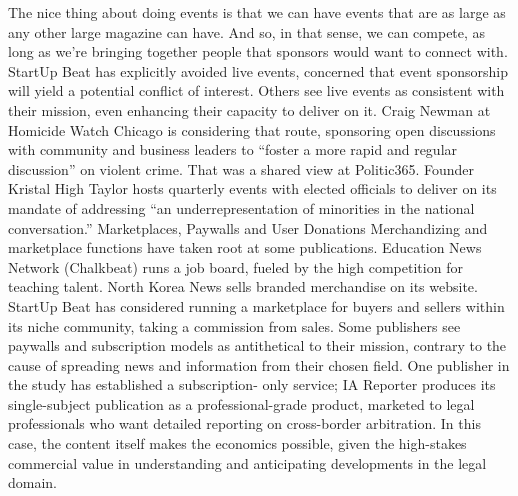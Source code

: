 The nice thing about doing events is that we can have events that are
as large as any other large magazine can have. And so, in that sense,
we can compete, as long as we’re bringing together people that sponsors
would want to connect with.
StartUp Beat has explicitly avoided live events, concerned that event sponsorship
will yield a potential conflict of interest. Others see live events as
consistent with their mission, even enhancing their capacity to deliver on
it. Craig Newman at Homicide Watch Chicago is considering that route,
sponsoring open discussions with community and business leaders to ``foster
a more rapid and regular discussion'' on violent crime. That was a shared
view at Politic365. Founder Kristal High Taylor hosts quarterly events with
elected officials to deliver on its mandate of addressing ``an underrepresentation
of minorities in the national conversation.''
Marketplaces, Paywalls and User Donations
Merchandizing and marketplace functions have taken root at some publications.
Education News Network (Chalkbeat) runs a job board, fueled by
the high competition for teaching talent. North Korea News sells branded
merchandise on its website. StartUp Beat has considered running a marketplace
for buyers and sellers within its niche community, taking a commission
from sales.
Some publishers see paywalls and subscription models as antithetical to
their mission, contrary to the cause of spreading news and information
from their chosen field. One publisher in the study has established a subscription-
only service; IA Reporter produces its single-subject publication
as a professional-grade product, marketed to legal professionals who want
detailed reporting on cross-border arbitration. In this case, the content itself
makes the economics possible, given the high-stakes commercial value in
understanding and anticipating developments in the legal domain.

